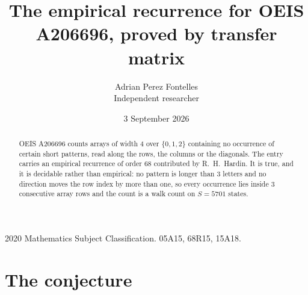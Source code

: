 \documentclass[11pt,a4paper]{article}
\title{The empirical recurrence for OEIS A206696, proved by transfer matrix}
\author{Adrian Perez Fontelles\\ \small Independent researcher}
\date{3 September 2026}
\theoremstyle{plain}
\theoremstyle{definition}
\begin{document}
\maketitle

\begin{abstract}
OEIS A206696 counts arrays of width $4$ over $\{0,1,2\}$ containing no occurrence of certain short
patterns, read along the rows, the columns or the diagonals. The entry carries an empirical
recurrence of order $68$ contributed by R.~H.~Hardin. It is true, and it is decidable
rather than empirical: no pattern is longer than $3$ letters and no direction moves the row
index by more than one, so every occurrence lies inside $3$ consecutive array rows and the
count is a walk count on $S=5701$ states.
\end{abstract}

\noindent\small 2020 Mathematics Subject Classification. 05A15, 68R15, 15A18.\normalsize

\section{The conjecture}
\end{document}
